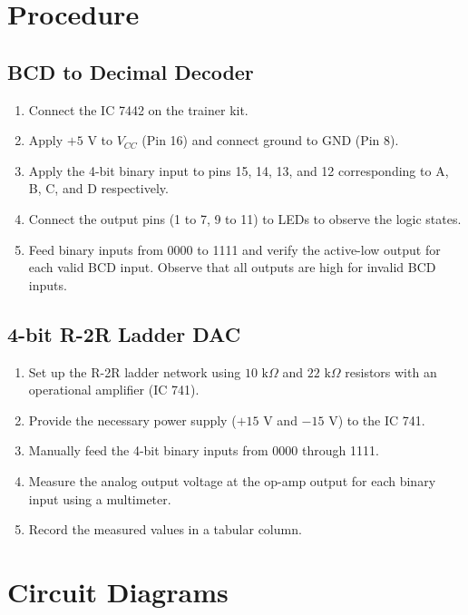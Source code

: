 \documentclass[12pt,a4paper]{article}
\begin{document}
\section{Procedure}
\subsection{BCD to Decimal Decoder}
\begin{enumerate}
    \item Connect the IC 7442 on the trainer kit.
    \item Apply $+5\text{ V}$ to $V_{CC}$ (Pin 16) and connect ground to GND (Pin 8).
    \item Apply the 4-bit binary input to pins 15, 14, 13, and 12 corresponding to A, B, C, and D respectively.
    \item Connect the output pins (1 to 7, 9 to 11) to LEDs to observe the logic states.
    \item Feed binary inputs from 0000 to 1111 and verify the active-low output for each valid BCD input. Observe that all outputs are high for invalid BCD inputs.
\end{enumerate}

\subsection{4-bit R-2R Ladder DAC}
\begin{enumerate}
    \item Set up the R-2R ladder network using $10\text{ k}\Omega$ and $22\text{ k}\Omega$ resistors with an operational amplifier (IC 741).
    \item Provide the necessary power supply ($+15\text{ V}$ and $-15\text{ V}$) to the IC 741.
    \item Manually feed the 4-bit binary inputs from 0000 through 1111.
    \item Measure the analog output voltage at the op-amp output for each binary input using a multimeter.
    \item Record the measured values in a tabular column.
\end{enumerate}

\section{Circuit Diagrams}
\end{document}
